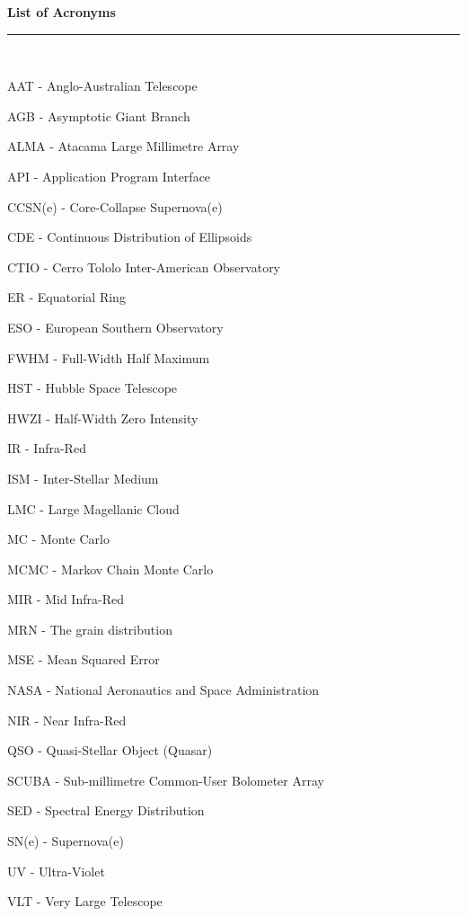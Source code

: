 \thispagestyle{empty}
\begin{raggedleft}
\vspace*{23mm}
\hfill {\huge {\bf {List of Acronyms}}} \\
\vspace{6mm}
\hfill \rule{4in}{.015in} \\
\vspace{19mm}
\end{raggedleft}




%
%

AAT - Anglo-Australian Telescope

AGB - Asymptotic Giant Branch

ALMA - Atacama Large Millimetre Array

API - Application Program Interface

CCSN(e) - Core-Collapse Supernova(e)

CDE - Continuous Distribution of Ellipsoids

CTIO - Cerro Tololo Inter-American Observatory

ER - Equatorial Ring

ESO - European Southern Observatory

FWHM - Full-Width Half Maximum

HST - Hubble Space Telescope

HWZI - Half-Width Zero Intensity

IR - Infra-Red

ISM - Inter-Stellar Medium

LMC - Large Magellanic Cloud

MC - Monte Carlo

MCMC - Markov Chain Monte Carlo

MIR - Mid Infra-Red 

MRN - The \citet*{Mathis1977} grain distribution

MSE - Mean Squared Error

NASA - National Aeronautics and Space Administration

NIR - Near Infra-Red

QSO - Quasi-Stellar Object (Quasar)

SCUBA - Sub-millimetre Common-User Bolometer Array

SED - Spectral Energy Distribution

SN(e) - Supernova(e)

UV - Ultra-Violet

VLT - Very Large Telescope
